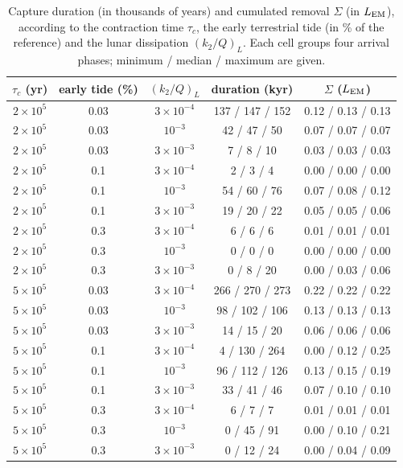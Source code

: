 \documentclass[11pt,a4paper]{article}
\newcommand{\LEM}{\ensuremath{L_{\rm EM}}}
\begin{document}
\begin{table}[htbp]
\centering\footnotesize\setlength{\tabcolsep}{5pt}
\caption{Capture duration (in thousands of years) and cumulated removal $\Sigma$ (in $\LEM$), according to the contraction time $\tau_c$, the early terrestrial tide (in \% of the reference) and the lunar dissipation $(k_2/Q)_L$. Each cell groups four arrival phases; minimum / median / maximum are given.\label{tab:duree}}
\begin{tabular}{ccccc}\toprule
$\tau_c$ (yr) & early tide (\%) & $(k_2/Q)_L$ & duration (kyr) & $\Sigma$ ($\LEM$) \\\midrule
$2\times10^5$ & 0.03 & $3\times10^{-4}$ & 137 / 147 / 152 & 0.12 / 0.13 / 0.13\\
$2\times10^5$ & 0.03 & $10^{-3}$ & 42 / 47 / 50 & 0.07 / 0.07 / 0.07\\
$2\times10^5$ & 0.03 & $3\times10^{-3}$ & 7 / 8 / 10 & 0.03 / 0.03 / 0.03\\
$2\times10^5$ & 0.1 & $3\times10^{-4}$ & 2 / 3 / 4 & 0.00 / 0.00 / 0.00\\
$2\times10^5$ & 0.1 & $10^{-3}$ & 54 / 60 / 76 & 0.07 / 0.08 / 0.12\\
$2\times10^5$ & 0.1 & $3\times10^{-3}$ & 19 / 20 / 22 & 0.05 / 0.05 / 0.06\\
$2\times10^5$ & 0.3 & $3\times10^{-4}$ & 6 / 6 / 6 & 0.01 / 0.01 / 0.01\\
$2\times10^5$ & 0.3 & $10^{-3}$ & 0 / 0 / 0 & 0.00 / 0.00 / 0.00\\
$2\times10^5$ & 0.3 & $3\times10^{-3}$ & 0 / 8 / 20 & 0.00 / 0.03 / 0.06\\
\midrule
$5\times10^5$ & 0.03 & $3\times10^{-4}$ & 266 / 270 / 273 & 0.22 / 0.22 / 0.22\\
$5\times10^5$ & 0.03 & $10^{-3}$ & 98 / 102 / 106 & 0.13 / 0.13 / 0.13\\
$5\times10^5$ & 0.03 & $3\times10^{-3}$ & 14 / 15 / 20 & 0.06 / 0.06 / 0.06\\
$5\times10^5$ & 0.1 & $3\times10^{-4}$ & 4 / 130 / 264 & 0.00 / 0.12 / 0.25\\
$5\times10^5$ & 0.1 & $10^{-3}$ & 96 / 112 / 126 & 0.13 / 0.15 / 0.19\\
$5\times10^5$ & 0.1 & $3\times10^{-3}$ & 33 / 41 / 46 & 0.07 / 0.10 / 0.10\\
$5\times10^5$ & 0.3 & $3\times10^{-4}$ & 6 / 7 / 7 & 0.01 / 0.01 / 0.01\\
$5\times10^5$ & 0.3 & $10^{-3}$ & 0 / 45 / 91 & 0.00 / 0.10 / 0.21\\
$5\times10^5$ & 0.3 & $3\times10^{-3}$ & 0 / 12 / 24 & 0.00 / 0.04 / 0.09\\

\end{tabular}
\end{table}
\end{document}
